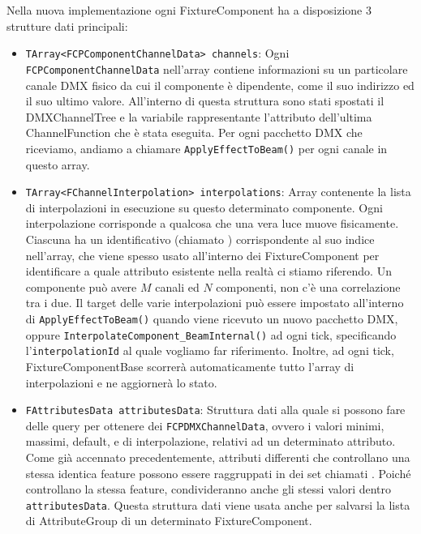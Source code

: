 \documentclass[main.tex]{subfiles}
\begin{document}
Nella nuova implementazione ogni FixtureComponent ha a disposizione 3 strutture dati principali: 
\begin{itemize}
    \item \lstinline{TArray<FCPComponentChannelData> channels}: Ogni \lstinline{FCPComponentChannelData} nell'array contiene informazioni su un particolare canale DMX fisico da cui il componente è dipendente, come il suo indirizzo ed il suo ultimo valore. All'interno di questa struttura sono stati spostati il DMXChannelTree e la variabile rappresentante l'attributo dell'ultima ChannelFunction che è stata eseguita. Per ogni pacchetto DMX che riceviamo, andiamo a chiamare \lstinline{ApplyEffectToBeam()} per ogni canale in questo array.
    \item \lstinline{TArray<FChannelInterpolation> interpolations}: Array contenente la lista di interpolazioni in esecuzione su questo determinato componente. Ogni interpolazione corrisponde a qualcosa che una vera luce muove fisicamente. Ciascuna ha un identificativo (chiamato ) corrispondente al suo indice nell'array, che viene spesso usato all'interno dei FixtureComponent per identificare a quale attributo esistente nella realtà ci stiamo riferendo. Un componente può avere $M$ canali ed $N$ componenti, non c'è una correlazione tra i due. Il target delle varie interpolazioni può essere impostato all'interno di \lstinline{ApplyEffectToBeam()} quando viene ricevuto un nuovo pacchetto DMX, oppure \lstinline{InterpolateComponent_BeamInternal()} ad ogni tick, specificando l'\lstinline{interpolationId} al quale vogliamo far riferimento. Inoltre, ad ogni tick, FixtureComponentBase scorrerà automaticamente tutto l'array di interpolazioni e ne aggiornerà lo stato.
    \item \lstinline{FAttributesData attributesData}: Struttura dati alla quale si possono fare delle query per ottenere dei \lstinline{FCPDMXChannelData}, ovvero i valori minimi, massimi, default, e di interpolazione, relativi ad un determinato attributo. Come già accennato precedentemente, attributi differenti che controllano una stessa identica feature possono essere raggruppati in dei set chiamati . Poiché controllano la stessa feature, condivideranno anche gli stessi valori dentro \lstinline{attributesData}. Questa struttura dati viene usata anche per salvarsi la lista di AttributeGroup di un determinato FixtureComponent.
\end{itemize}

\end{document}
